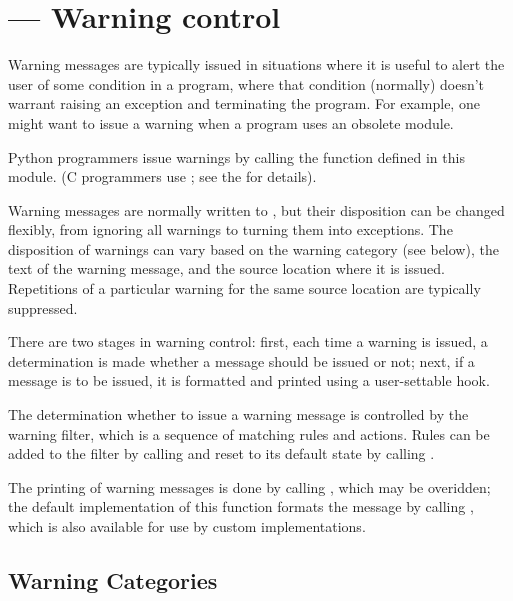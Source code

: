 \section{ ---
         Warning control}



Warning messages are typically issued in situations where it is useful
to alert the user of some condition in a program, where that condition
(normally) doesn't warrant raising an exception and terminating the
program.  For example, one might want to issue a warning when a
program uses an obsolete module.

Python programmers issue warnings by calling the 
function defined in this module.  (C programmers use
; see the
 for details).

Warning messages are normally written to , but their
disposition can be changed flexibly, from ignoring all warnings to
turning them into exceptions.  The disposition of warnings can vary
based on the warning category (see below), the text of the warning
message, and the source location where it is issued.  Repetitions of a
particular warning for the same source location are typically
suppressed.

There are two stages in warning control: first, each time a warning is
issued, a determination is made whether a message should be issued or
not; next, if a message is to be issued, it is formatted and printed
using a user-settable hook.

The determination whether to issue a warning message is controlled by
the warning filter, which is a sequence of matching rules and actions.
Rules can be added to the filter by calling
 and reset to its default state by calling
.

The printing of warning messages is done by calling
, which may be overidden; the default
implementation of this function formats the message by calling
, which is also available for use by custom
implementations.


\subsection{Warning Categories \label{warning-categories}}

